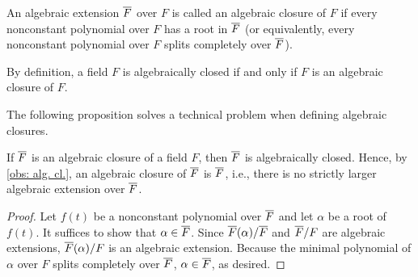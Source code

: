 \begin{defi}
    An algebraic extension $\overline{F}$ over $F$ is called an algebraic closure of $F$ if every nonconstant polynomial over $F$ has a root in $\overline{F}$ (or equivalently, every nonconstant polynomial over $F$ splits completely over $\overline{F}$).
\end{defi}
\begin{rmk}
    By definition, a field $F$ is algebraically closed if and only if $F$ is an algebraic closure of $F$.
\end{rmk}
The following proposition solves a technical problem when defining algebraic closures.
\begin{prop}
    If $\overline{F}$ is an algebraic closure of a field $F$, then $\overline{F}$ is algebraically closed.
    Hence, by \cref{obs: alg. cl.}, an algebraic closure of $\overline{F}$ is $\overline{F}$, i.e., there is no strictly larger algebraic extension over $\overline{F}$.
\end{prop}
\begin{proof}
    Let $f(t)$ be a nonconstant polynomial over $\overline{F}$ and let $\alpha$ be a root of $f(t)$.
    It suffices to show that $\alpha\in\overline{F}$.
    Since $\overline{F}(\alpha)/\overline{F}$ and $\overline{F}/F$ are algebraic extensions, $\overline{F}(\alpha)/F$ is an algebraic extension.
    Because the minimal polynomial of $\alpha$ over $F$ splits completely over $\overline{F}$, $\alpha\in\overline{F}$, as desired.
\end{proof}

